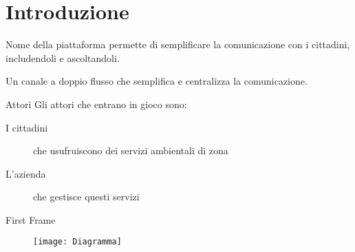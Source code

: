 \section{Introduzione}
\begin{frame}{}

  Nome della piattaforma permette di semplificare la comunicazione con i cittadini, includendoli e ascoltandoli.
  \pause
  \bigskip

  Un canale a doppio flusso che semplifica e centralizza la comunicazione.


\end{frame}
\begin{frame}{Attori}
  Gli attori che entrano in gioco sono:
  \begin{description}
    \item[I cittadini] che usufruiscono dei servizi ambientali di zona
    \item[L'azienda] che gestisce questi servizi
  \end{description}


\end{frame}
\begin{frame}{First Frame}

  \begin{figure}

    \texttt{[image: Diagramma]}
  \end{figure}

\end{frame}
